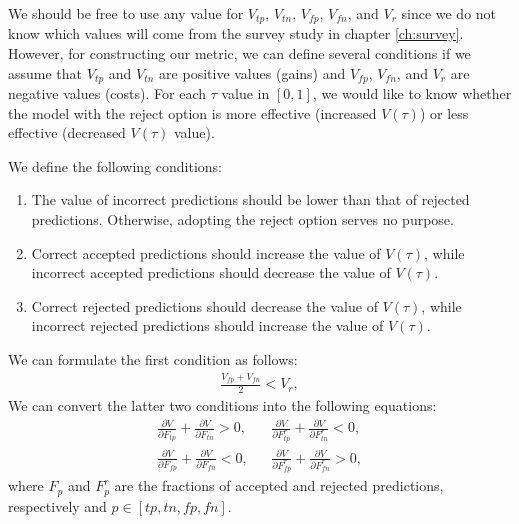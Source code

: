 %
We should be free to use any value for $V_{tp}$, $V_{tn}$, $V_{fp}$, $V_{fn}$, and $V_r$ since we do not know which values will come from the survey study in chapter \ref{ch:survey}.
%
However, for constructing our metric, we can define several conditions if we assume that $V_{tp}$ and $V_{tn}$ are positive values (gains) and $V_{fp}$, $V_{fn}$, and $V_{r}$ are negative values (costs).
%
For each $\tau$ value in $[0, 1]$, we would like to know whether the model with the reject option is more effective (increased $V(\tau)$) or less effective (decreased $V(\tau)$ value).
%

\pagebreak

%
\begin{flushleft}
    We define the following conditions:
\end{flushleft}
\begin{enumerate}
    \item The value of incorrect predictions should be lower than that of rejected predictions. Otherwise, adopting the reject option serves no purpose.
    \item Correct accepted predictions should increase the value of $V(\tau)$, while incorrect accepted predictions should decrease the value of $V(\tau)$.
    \item Correct rejected predictions should decrease the value of $V(\tau)$, while incorrect rejected predictions should increase the value of $V(\tau)$.
\end{enumerate}
%
We can formulate the first condition as follows:
% 
\begin{align}
    \label{for:value-condition}
    \frac{V_{fp} + V_{fn}}{2} < V_r,
\end{align}
%
We can convert the latter two conditions into the following equations:
\begin{subequations}
    \label{for:conditions}
    \begin{align}
        \frac{\partial V}{\partial F_{tp}} + \frac{\partial V}{\partial F_{tn}} > 0, &  &
        \frac{\partial V}{\partial F^r_{tp}} + \frac{\partial V}{\partial F^r_{tn}} < 0, \label{for:conditions-tp-tn} \\
        \frac{\partial V}{\partial F_{fp}} + \frac{\partial V}{\partial F_{fn}} < 0, &  &
        \frac{\partial V}{\partial F^r_{fp}} + \frac{\partial V}{\partial F^r_{fn}} > 0, \label{for:conditions-fp-fn}
    \end{align}
\end{subequations}
%
where $F_p$ and $F_p^r$ are the fractions of accepted and rejected predictions, respectively and $p \in [tp, tn, fp, fn]$.
